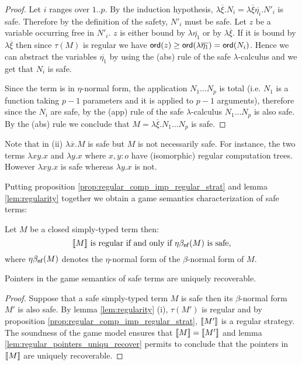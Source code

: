 \begin{proof}
Let $i$ ranges over $1..p$.
By the induction hypothesis, $\lambda \overline{\xi} . N_i = \lambda \overline{\xi} \overline{\eta_i} . N'_i$ is safe. Therefore by the definition of
the safety, $N'_i$ must be safe.
Let $z$ be a variable occurring free in $N'_i$. $z$ is either bound by $\lambda \overline{\eta_1}$ or by $\lambda \overline{\xi}$.
If it is bound by $\lambda \overline{\xi}$ then since $\tau(M)$ is regular we have ${\sf ord}(z) \geq {\sf ord}(\lambda \overline{\eta_1}) = {\sf ord}(N_i)$.
Hence we can abstract the variables $\overline{\eta_1}$ by using the (abs) rule of the safe $\lambda$-calculus and we get that $N_i$ is safe.

Since the term is in $\eta$-normal form, the application $N_1 \ldots N_p$ is total (i.e. $N_1$ is a function taking $p-1$ parameters
and it is applied to $p-1$ arguments), therefore since the $N_i$ are safe, by the (app) rule of the safe $\lambda$-calculus
$N_1 \ldots N_p$ is also safe.
By the (abs) rule we conclude that $M = \lambda \overline{\xi} . N_1 \ldots N_p$ is safe.
\end{proof}

Note that in (ii) $\lambda \overline{x} . M$ is safe but $M$ is not necessarily safe. For instance, the two terms
$\lambda x y .x$ and $\lambda y . x$ where $x,y:o$ have (isomorphic) regular computation trees. However $\lambda x y .x$ is safe
whereas $\lambda y . x$ is not.



Putting proposition \ref{prop:regular_comp_imp_regular_strat} and lemma \ref{lem:regularity} together we
obtain a game semantics characterization of safe terms:
\begin{cor}
Let $M$ be a closed simply-typed term then:
$$ {[\![ M ]\!]} \mbox{ is regular if and only if $\eta\beta_{\sf nf}(M)$ is safe,} $$
where $\eta\beta_{\sf nf}(M)$ denotes the $\eta$-normal form of the $\beta$-normal form of $M$.
\end{cor}



\begin{thm}
Pointers in the game semantics of safe terms are uniquely recoverable.
\end{thm}
\begin{proof}
Suppose that a safe simply-typed term $M$ is safe then its $\beta$-normal form $M'$ is also safe.
By lemma \ref{lem:regularity} (i), $\tau(M')$ is regular and
by proposition \ref{prop:regular_comp_imp_regular_strat},
${[\![ M' ]\!]}$ is a regular strategy.
The soundness of the game model ensures that ${[\![ M ]\!]} = {[\![ M' ]\!]}$ and lemma \ref{lem:regular_pointers_uniqu_recover} permits
to conclude that the pointers in ${[\![ M ]\!]}$ are uniquely recoverable.
\end{proof}



